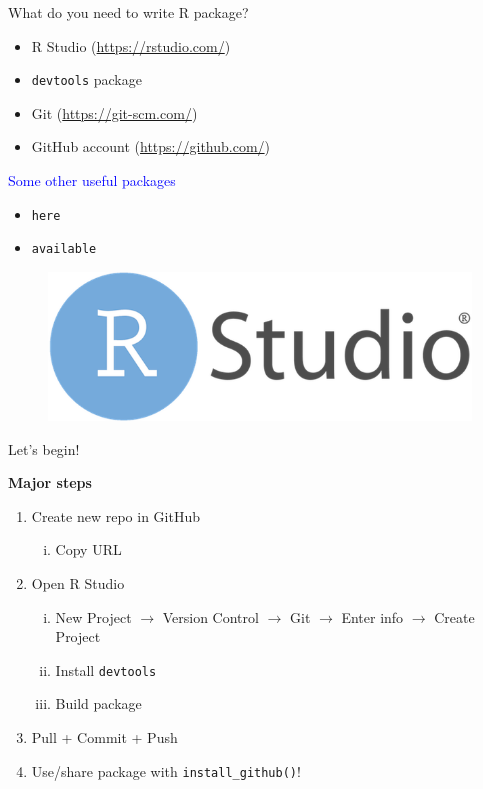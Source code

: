 \documentclass[
  ignorenonframetext,
]{beamer}
\providecommand{\tightlist}{%
  \setlength{\itemsep}{0pt}\setlength{\parskip}{0pt}}
\begin{document}
\begin{frame}[fragile]{What do you need to write R package?}
\protect\hypertarget{what-do-you-need-to-write-r-package}{}

\begin{itemize}
\tightlist
\item
  R Studio (\url{https://rstudio.com/})
\item
  \texttt{devtools} package
\item
  Git (\url{https://git-scm.com/})
\item
  GitHub account (\url{https://github.com/})
\end{itemize}

\textcolor{blue}{Some other useful packages}

\begin{itemize}
\tightlist
\item
  \texttt{here}
\item
  \texttt{available}
\end{itemize}

\begin{figure}
  \includegraphics[scale=0.2]{slides_files/figure-beamer/Rstudio.png}
\end{figure}

\end{frame}

\begin{frame}[fragile]{Let's begin!}
\protect\hypertarget{lets-begin}{}

\textbf{Major steps}

\begin{enumerate}
\tightlist
\item
  Create new repo in GitHub

  \begin{enumerate}
  [i)]
  \tightlist
  \item
    Copy URL
  \end{enumerate}
\item
  Open R Studio

  \begin{enumerate}
  [i)]
  \tightlist
  \item
    New Project \(\rightarrow\) Version Control \(\rightarrow\) Git
    \(\rightarrow\) Enter info \(\rightarrow\) Create Project
  \item
    Install \texttt{devtools}
  \item
    Build package
  \end{enumerate}
\item
  Pull + Commit + Push
\item
  Use/share package with \texttt{install\_github()}!
\end{enumerate}

\end{frame}
\end{document}
